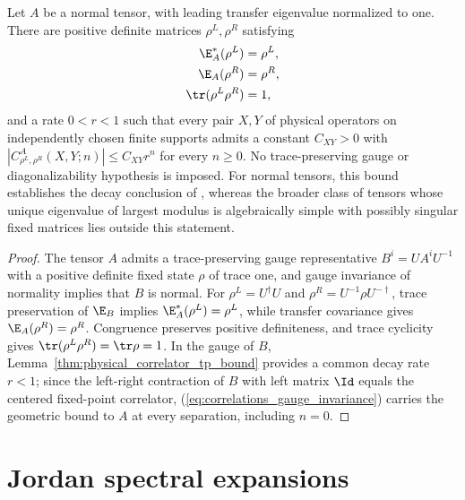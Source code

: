 \begin{theorem}
    \label{thm:correlator_exponential_bound}
    \leanok
    Let $A$ be a normal tensor, with leading transfer eigenvalue normalized
    to one. There are positive definite matrices $\rho^L,\rho^R$ satisfying
    \begin{align}
        \E_A^*(\rho^L)    & =\rho^L,
        \\
        \E_A(\rho^R)      & =\rho^R,
        \\
        \tr(\rho^L\rho^R) & =1,
    \end{align}
    and a rate $0<r<1$ such that every pair $X,Y$ of physical operators
    on independently chosen finite supports admits a constant $C_{XY}>0$
    with
    $|C_{\rho^L,\rho^R}^{A}(X,Y;n)|\leq C_{XY}r^n$ for every $n\geq0$.
    No trace-preserving gauge or diagonalizability hypothesis is imposed.
    For normal tensors, this bound establishes the decay conclusion of
    \cite[Section~II.B.3]{Cirac2021Matrix}, whereas the broader class of
    tensors whose unique eigenvalue of largest modulus is algebraically
    simple with possibly singular fixed matrices lies outside this statement.
\end{theorem}
\begin{proof}
    \leanok
    The tensor $A$ admits a trace-preserving gauge representative
    $B^i=UA^iU^{-1}$ with a positive definite fixed state $\rho$ of trace one,
    and gauge invariance of normality implies that $B$ is normal. For
    $\rho^L=U^\dagger U$ and $\rho^R=U^{-1}\rho U^{-\dagger}$,
    trace preservation of $\E_B$ implies $\E_A^*(\rho^L)=\rho^L$, while
    transfer covariance gives $\E_A(\rho^R)=\rho^R$.
    Congruence preserves positive definiteness, and trace cyclicity gives
    $\tr(\rho^L\rho^R)=\tr\rho=1$.
    In the gauge of $B$, Lemma~\ref{thm:physical_correlator_tp_bound} provides
    a common decay rate $r<1$; since the left-right contraction of $B$ with left
    matrix $\Id$ equals the centered fixed-point correlator,
    (\ref{eq:correlations_gauge_invariance}) carries the geometric bound to $A$
    at every separation, including $n=0$.
\end{proof}

\section{Jordan spectral expansions}

